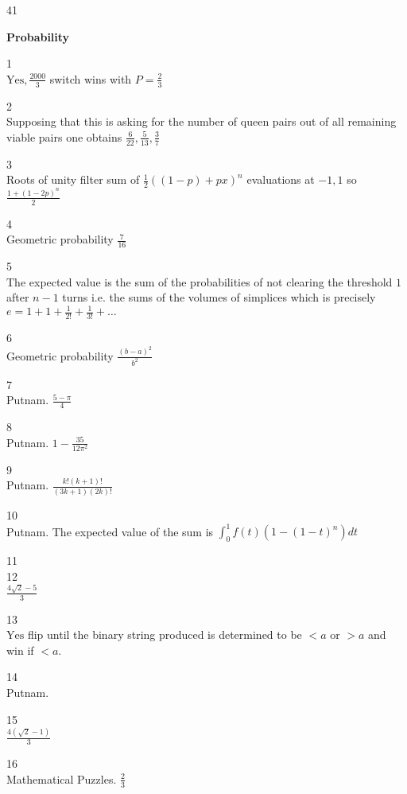 41 \\


\newpage

\textbf{Probability}

1 \\
$\boxed{\text{Yes},\frac{2000}{3}}$ switch wins with $P=\frac{2}{3}$

2 \\
Supposing that this is asking for the number of queen pairs out of all remaining viable pairs one obtains $\boxed{\frac{6}{22},\frac{5}{13},\frac{3}{7}}$

3 \\
Roots of unity filter sum of $\frac{1}{2}((1-p)+px)^n$ evaluations at $-1,1$ so $\frac{1+(1-2p)^n}{2}$

4 \\
Geometric probability $\boxed{\frac{7}{16}}$

5 \\
The expected value is the sum of the probabilities of not clearing the threshold $1$ after $n-1$ turns i.e. the sums of the volumes of simplices which is precisely $e=1+1+\frac{1}{2!}+\frac{1}{3!}+\dots$

6 \\
Geometric probability $\boxed{\frac{(b-a)^2}{b^2}}$

7 \\
Putnam. $\boxed{\frac{5-\pi}{4}}$

8 \\
Putnam. $\boxed{1-\frac{35}{12\pi^2}}$

9 \\
Putnam. $\boxed{\frac{k!(k+1)!}{(3k+1)(2k)!}}$

10 \\
Putnam. The expected value of the sum is $\int_0^1 f(t) (1-(1-t)^n) dt$

11 \\


12 \\
$\boxed{\frac{4\sqrt{2}-5}{3}}$

13 \\
$\boxed{\text{Yes}}$ flip until the binary string produced is determined to be $<a$ or $>a$ and win if $<a$.

14 \\
Putnam.

15 \\
$\boxed{\frac{4(\sqrt{2}-1)}{3}}$

16 \\
Mathematical Puzzles. $\boxed{\frac{2}{3}}$

